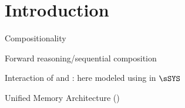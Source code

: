\section{Introduction}
\label{sec:intro}

Compositionality

Forward reasoning/sequential composition

Interaction of \CPU{} and \GPU{}: here modeled using in $\sSYS$

Unified Memory Architecture (\UMA)